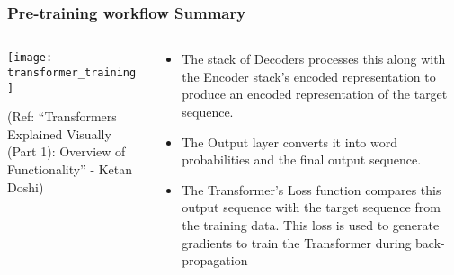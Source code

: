 \begin{frame}[fragile]\frametitle{Pre-training workflow Summary}

\begin{columns}
     \begin{column}[T]{0.5\linewidth}
\begin{center}
\texttt{[image: transformer\_training]}


{\tiny (Ref: ``Transformers Explained Visually (Part 1): Overview of Functionality'' - Ketan Doshi)}
\end{center}		

		\end{column}
    \begin{column}[T]{0.5\linewidth}

\begin{itemize}
\item The stack of Decoders processes this along with the Encoder stack’s encoded representation to produce an encoded representation of the target sequence.
\item The Output layer converts it into word probabilities and the final output sequence.
\item The Transformer’s Loss function compares this output sequence with the target sequence from the training data. This loss is used to generate gradients to train the Transformer during back-propagation
\end{itemize}
    \end{column}
  \end{columns}	

\end{frame}

